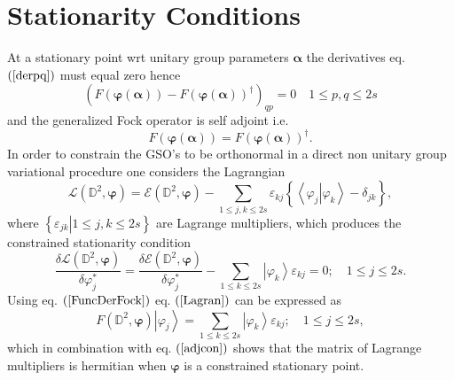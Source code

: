 \documentclass[aps,preprint]{revtex4}%
\begin{document}
\section{Stationarity Conditions\label{StatCon}}

At a stationary point wrt unitary group parameters $\mathbf{\alpha}$ the
derivatives eq. $\left(  \ref{derpq}\right)  $ must equal zero hence
\begin{equation}
\left(  F\left(  \mathbf{\varphi}\left(  \mathbf{\alpha}\right)  \right)
-F\left(  \mathbf{\varphi}\left(  \mathbf{\alpha}\right)  \right)  ^{\dagger
}\right)  _{qp}=0\quad1\leq p,q\leq2s
\end{equation}
and the generalized Fock operator is self adjoint i.e.
\begin{equation}
F\left(  \mathbf{\varphi}\left(  \mathbf{\alpha}\right)  \right)  =F\left(
\mathbf{\varphi}\left(  \mathbf{\alpha}\right)  \right)  ^{\dagger}.
\label{adjcon}%
\end{equation}
In order to constrain the GSO's to be orthonormal in a direct non unitary
group variational procedure one considers the Lagrangian
\begin{equation}
\mathcal{L}\left(  \mathbb{D}^{2},\mathbf{\varphi}\right)  =\mathcal{E}\left(
\mathbb{D}^{2},\mathbf{\varphi}\right)  -\sum_{1\leq j,k\leq2s}\varepsilon
_{kj}\left\{  \left\langle \left.  \varphi_{j}\right\vert \varphi
_{k}\right\rangle -\delta_{jk}\right\}  ,
\end{equation}
where $\left\{  \left.  \varepsilon_{jk}\right\vert 1\leq j,k\leq2s\right\}  $
are Lagrange multipliers, which produces the constrained stationarity
condition
\begin{equation}
\frac{\delta\mathcal{L}\left(  \mathbb{D}^{2},\mathbf{\varphi}\right)
}{\delta\varphi_{j}^{\ast}}=\frac{\delta\mathcal{E}\left(  \mathbb{D}%
^{2},\mathbf{\varphi}\right)  }{\delta\varphi_{j}^{\ast}}-\sum_{1\leq k\leq
2s}\left\vert \varphi_{k}\right\rangle \varepsilon_{kj}=0;\quad1\leq j\leq2s.
\label{Lagran}%
\end{equation}
Using eq. $\left(  \ref{FuncDerFock}\right)  $ eq. $\left(  \ref{Lagran}%
\right)  $ can be expressed as
\begin{equation}
F\left(  \mathbb{D}^{2},\mathbf{\varphi}\right)  \left\vert \varphi
_{j}\right\rangle =\sum_{1\leq k\leq2s}\left\vert \varphi_{k}\right\rangle
\varepsilon_{kj};\quad1\leq j\leq2s,
\end{equation}
which in combination with eq. $\left(  \ref{adjcon}\right)  $ shows that the
matrix of Lagrange multipliers is hermitian when $\mathbf{\varphi}$ is a
constrained stationary point.
\end{document}
